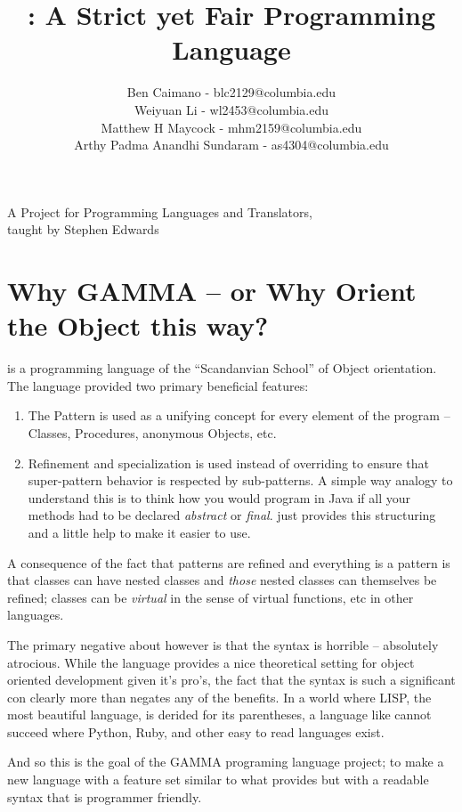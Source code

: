 \documentclass[10pt]{article}
\title{\Lang{}: A Strict yet Fair Programming Language}
\author{
	Ben Caimano - blc2129@columbia.edu \\
	Weiyuan Li - wl2453@columbia.edu \\
	Matthew H Maycock - mhm2159@columbia.edu \\
	Arthy Padma Anandhi Sundaram - as4304@columbia.edu
}
\date{}
\newcommand{\Lang}{GAMMA}
\begin{document}
\maketitle
\begin{center}
\large
A Project for Programming Languages and Translators,
\\taught by Stephen Edwards
\end{center}


\section*{Why \Lang{} -- or Why Orient the Object this way?}
 is a programming language of the ``Scandanvian School'' of Object
orientation. The language provided two primary beneficial features:

\begin{enumerate}
\item The  Pattern is used as a unifying concept for every element
of the program -- Classes, Procedures, anonymous Objects, etc.
\item Refinement and specialization is used instead of overriding to
ensure that super-pattern behavior is respected by sub-patterns. A
simple way analogy to understand this is to think how you would program
in Java if all your methods had to be declared \emph{abstract} or
\emph{final}. just provides this structuring and a little help to
make it easier to use.
\end{enumerate}

A consequence of the fact that patterns are refined and everything is a
pattern is that classes can have nested classes and \emph{those} nested
classes can themselves be refined; classes can be \emph{virtual} in the
sense of virtual functions, etc in other languages.

The primary negative about however is that the syntax is horrible
-- absolutely atrocious. While the language provides a nice theoretical
setting for object oriented development given it's pro's, the fact that
the syntax is such a significant con clearly more than negates any of
the benefits. In a world where LISP, the most beautiful language, is
derided for its parentheses, a language like  cannot succeed
where Python, Ruby, and other easy to read languages exist.

And so this is the goal of the \Lang{} programing language project; to
make a new language with a feature set similar to what  provides
but with a readable syntax that is programmer friendly.
\end{document}
